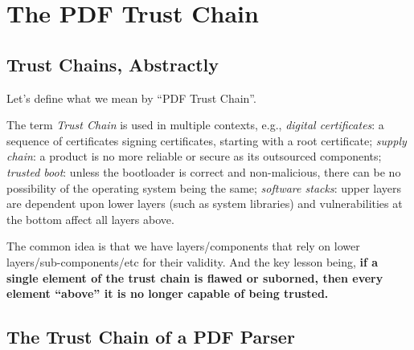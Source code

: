 \section{The PDF Trust Chain }
\label{sec:trust-chain}

\subsection{Trust Chains, Abstractly}

Let's define what we mean by ``PDF Trust Chain''.

The term \emph{Trust Chain} is used in multiple contexts, e.g.,
\emph{digital certificates}: a sequence of certificates signing certificates,
starting with a root certificate;
\emph{supply chain}: a product is no more reliable or secure as its
outsourced components;
\emph{trusted boot}: unless the bootloader is correct and non-malicious,
there can be no possibility of the operating system being the same;
\emph{software stacks}: upper layers are dependent upon lower layers (such as
system libraries) and vulnerabilities at the bottom affect all layers above.

The common idea is that we have layers/components that rely on lower
layers/sub-components/etc for their validity.
And the key lesson being,
{\bf{if a single element of the trust chain 
  is flawed or suborned, then every element ``above'' it
  is no longer capable of being trusted.}}


\subsection{The Trust Chain of a PDF Parser}


